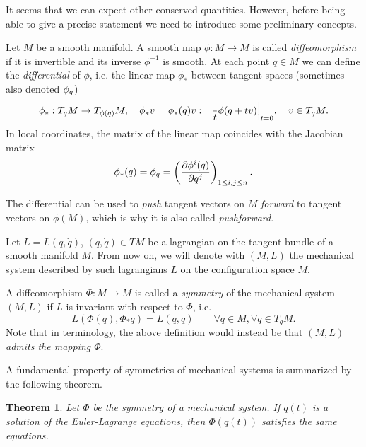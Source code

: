 \documentclass[english,fontsize=11pt,paper=a5,oneside]{scrbook}
\let\d\relax
\DeclareMathOperator{\d}{d}
\newtheorem{theorem}{Theorem}[chapter]
\theoremstyle{definition}
\begin{document}
It seems that we can expect other conserved quantities. However, before being able to give a precise statement we need to introduce some preliminary concepts.

Let $M$ be a smooth manifold. A smooth map $\phi : M \to M$ is called \emph{diffeomorphism} if it is invertible and its inverse $\phi^{-1}$ is smooth. At each point $q\in M$ we can define the \emph{differential} of $\phi$, i.e. the linear map $\phi_*$ between tangent spaces (sometimes also denoted $\d\phi_q$)
\begin{equation}
    \phi_*: T_q M \to T_{\phi(q)} M,
    \quad \phi_* v = \phi_*(q) v := \frac{\d}{\d t} \phi(q + t v) \Big|_{t=0},
    \quad v\in T_q M.
\end{equation}
In local coordinates, the matrix of the linear map coincides with the Jacobian matrix
\begin{equation}
   \phi_*(q) = \d \phi_q = \left(\frac{\partial \phi^i(q)}{\partial q^j}\right)_{1\leq i,j\leq n}.
\end{equation}

The differential can be used to \emph{push} tangent vectors on $M$ \emph{forward} to tangent vectors on $\phi(M)$, which is why it is also called \emph{pushforward}.

\begin{tcolorbox}
    Let $L = L(q, \dot q)$, $(q, \dot q)\in TM$ be a lagrangian on the tangent bundle of a smooth manifold $M$. From now on, we will denote with $(M, L)$ the mechanical system described by such lagrangians $L$ on the configuration space $M$. 
\end{tcolorbox}

A diffeomorphism $\Phi: M \to M$ is called a \emph{symmetry} of the mechanical system $(M,L)$ if $L$ is invariant with respect to $\Phi$, i.e.
\begin{equation}\label{eq:symmetry}
    L\left(\Phi(q), \Phi_*\dot q\right) = L(q,\dot q) \qquad \forall q\in M, \forall\dot q \in T_q M.
\end{equation}
Note that in \cite[Chapter 4]{book:arnold} terminology, the above definition would instead be that \emph{$(M,L)$ admits the mapping $\Phi$}.

A fundamental property of symmetries of mechanical systems is summarized by the following theorem.

\begin{theorem}
    Let $\Phi$ be the symmetry of a mechanical system. If $q(t)$ is a solution of the Euler-Lagrange equations, then $\Phi(q(t))$ satisfies the same equations.
\end{theorem}
\end{document}
